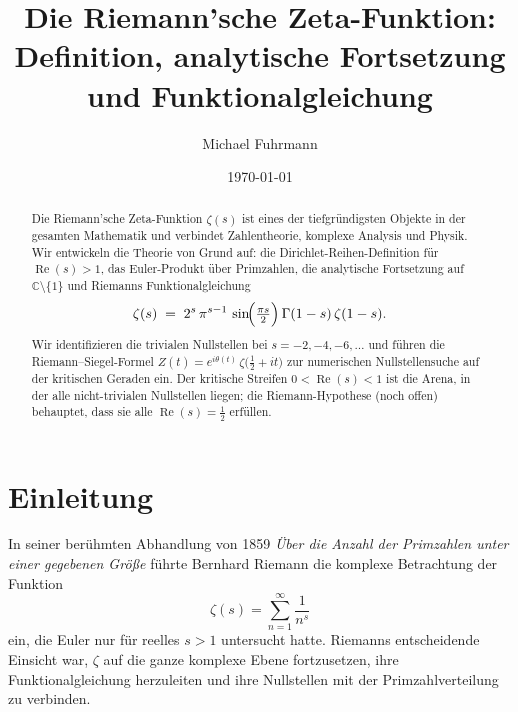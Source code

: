 \documentclass[12pt,a4paper]{amsart}
\theoremstyle{definition}
\newcommand{\C}{\mathbb{C}}
\DeclareMathOperator{\Re}{Re}
\begin{document}

\title{Die Riemann'sche Zeta-Funktion:\\
       Definition, analytische Fortsetzung und Funktionalgleichung}

\author{Michael Fuhrmann}
\address{Specialist Mathematics Project, Build 84}
\date{\today}

\begin{abstract}
Die Riemann'sche Zeta-Funktion $\zeta(s)$ ist eines der tiefgr\"undigsten
Objekte in der gesamten Mathematik und verbindet Zahlentheorie, komplexe
Analysis und Physik.
Wir entwickeln die Theorie von Grund auf:
die Dirichlet-Reihen-Definition f\"ur $\Re(s) > 1$,
das Euler-Produkt \"uber Primzahlen,
die analytische Fortsetzung auf $\C \setminus \{1\}$
und Riemanns Funktionalgleichung
\[
  \zeta(s) \;=\; 2^s\,\pi^{s-1}\,\sin\!\Bigl(\tfrac{\pi s}{2}\Bigr)\,
  \Gamma(1-s)\,\zeta(1-s).
\]
Wir identifizieren die trivialen Nullstellen bei $s = -2, -4, -6, \ldots$
und f\"uhren die Riemann--Siegel-Formel $Z(t) = e^{i\theta(t)}\,\zeta\!\bigl(\tfrac{1}{2}+it\bigr)$
zur numerischen Nullstellensuche auf der kritischen Geraden ein.
Der kritische Streifen $0 < \Re(s) < 1$ ist die Arena, in der alle
nicht-trivialen Nullstellen liegen; die Riemann-Hypothese (noch offen)
behauptet, dass sie alle $\Re(s) = \tfrac{1}{2}$ erf\"ullen.
\end{abstract}

\maketitle
\tableofcontents

\section{Einleitung}

In seiner ber\"uhmten Abhandlung von 1859 \emph{\"Uber die Anzahl der
Primzahlen unter einer gegebenen Gr\"o\ss e} \cite{Riemann1859}
f\"uhrte Bernhard Riemann die komplexe Betrachtung der Funktion
\[
  \zeta(s) = \sum_{n=1}^{\infty} \frac{1}{n^s}
\]
ein, die Euler nur f\"ur reelles $s > 1$ untersucht hatte.
Riemanns entscheidende Einsicht war, $\zeta$ auf die ganze komplexe Ebene
fortzusetzen, ihre Funktionalgleichung herzuleiten und ihre Nullstellen mit
der Primzahlverteilung zu verbinden.
\end{document}

